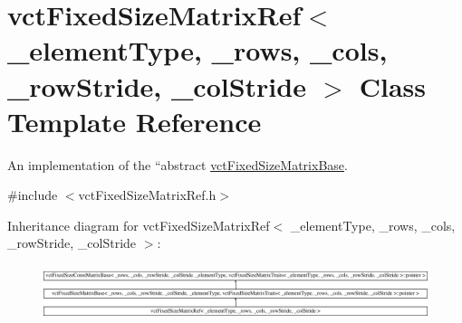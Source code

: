 \hypertarget{classvct_fixed_size_matrix_ref}{}\section{vct\+Fixed\+Size\+Matrix\+Ref$<$ \+\_\+element\+Type, \+\_\+rows, \+\_\+cols, \+\_\+row\+Stride, \+\_\+col\+Stride $>$ Class Template Reference}
\label{classvct_fixed_size_matrix_ref}


An implementation of the ``abstract\textquotesingle{}\textquotesingle{} \hyperlink{classvct_fixed_size_matrix_base}{vct\+Fixed\+Size\+Matrix\+Base}.  




{\ttfamily \#include $<$vct\+Fixed\+Size\+Matrix\+Ref.\+h$>$}

Inheritance diagram for vct\+Fixed\+Size\+Matrix\+Ref$<$ \+\_\+element\+Type, \+\_\+rows, \+\_\+cols, \+\_\+row\+Stride, \+\_\+col\+Stride $>$\+:\begin{figure}[H]
\begin{center}
\leavevmode
\includegraphics[height=1.648675cm]{d8/daa/classvct_fixed_size_matrix_ref}
\end{center}
\end{figure}
